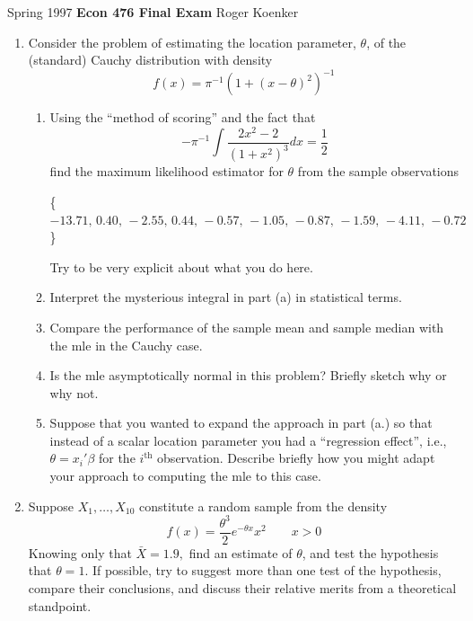 \vspace{10mm}
Spring 1997 \hfill {\bf Econ 476 Final Exam} \hfill Roger Koenker
\begin{enumerate}
\item Consider the problem of estimating the location parameter, $\theta$, 
of the (standard) Cauchy distribution with density
\[
f(x) = \pi^{-1} (1 + (x-\theta)^2)^{-1}
\]
\begin{enumerate}
\item  Using the ``method of scoring'' and the fact that
\[
-\pi^{-1} \int \frac{2x^2-2}{(1+x^2)^3} dx = \frac{1}{2}
\]
find the maximum likelihood estimator for $\theta$ from the sample observations

\vspace{3mm}
\{$-13.71,\,0.40,\,-2.55,\,0.44,\,-0.57,\,-1.05,\,-0.87,\,-1.59,\,-4.11,\,-0.72$\}

\vspace{3mm}

Try to be very explicit about what you do here.

\item Interpret the mysterious integral in part (a) in statistical terms.
\item Compare the performance of the sample mean and sample median with the 
mle in the Cauchy case.

\item Is the mle asymptotically normal in this problem?  
Briefly sketch why or why not.

\item Suppose that you wanted to expand the approach in part (a.) so that
instead of a scalar location parameter you had a ``regression effect'', i.e., 
$\theta=x_i'\beta$ for the $i^{\mbox{th}}$ observation.  Describe briefly how you might adapt your 
approach to computing the mle to this case.

\end{enumerate}

\item Suppose $X_1, \ldots, X_{10}$ constitute a random sample from the density
\[
f(x) = \frac{\theta^3}{2} e^{-\theta x} x^2 \qquad x>0
\]
Knowing only that $\bar X = 1.9, $ find an estimate of $\theta$, and test
the hypothesis that $\theta = 1. $   If possible, try to suggest more than one
test of the hypothesis, compare their conclusions, and discuss their relative
merits from a theoretical standpoint.


\end{enumerate}
